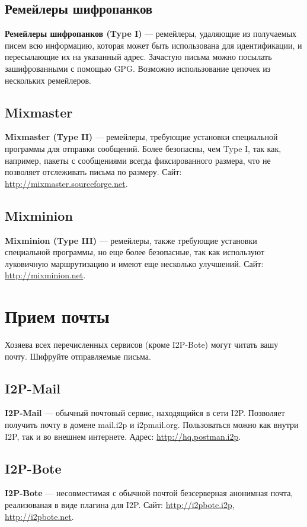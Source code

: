 \subsection{Ремейлеры шифропанков}
\textbf{Ремейлеры шифропанков (Type I)} --- ремейлеры, удаляющие из получаемых писем всю информацию, которая может быть использована для идентификации, и пересылающие их на указанный адрес. Зачастую письма можно посылать зашифрованными с помощью GPG. Возможно использование цепочек из нескольких ремейлеров.
\subsection{Mixmaster}
\textbf{Mixmaster (Type II)} --- ремейлеры, требующие установки специальной программы для отправки сообщений. Более безопасны, чем Type I, так как, например, пакеты с сообщениями всегда фиксированного размера, что не позволяет отслеживать письма по размеру. Сайт: \url{http://mixmaster.sourceforge.net}.
\subsection{Mixminion}
\textbf{Mixminion (Type III)} --- ремейлеры, также требующие установки специальной программы, но еще более безопасные, так как используют луковичную маршрутизацию и имеют еще несколько улучшений. Сайт: \url{http://mixminion.net}.

\section{Прием почты}
\begin{important}
Хозяева всех перечисленных сервисов (кроме I2P-Bote) могут читать вашу почту. Шифруйте отправляемые письма.
\end{important}
\subsection{I2P-Mail}
\textbf{I2P-Mail} --- обычный почтовый сервис, находящийся в сети I2P. Позволяет получить почту в домене mail.i2p и i2pmail.org. Пользоваться можно как внутри I2P, так и во внешнем интернете. Адрес: \url{http://hq.postman.i2p}.
\subsection{I2P-Bote}
\textbf{I2P-Bote} --- несовместимая с обычной почтой безсерверная анонимная почта, реализованая в виде плагина для I2P. Сайт: \url{http://i2pbote.i2p}, \url{http://i2pbote.net}.
